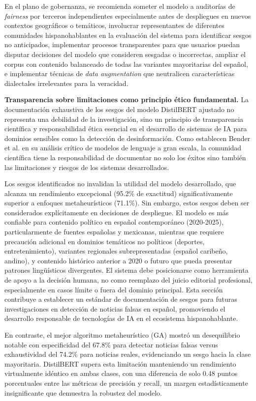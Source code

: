 En el plano de gobernanza, se recomienda someter el modelo a auditorías de \textit{fairness} por terceros independientes especialmente antes de despliegues en nuevos contextos geográficos o temáticos, involucrar representantes de diferentes comunidades hispanohablantes en la evaluación del sistema para identificar sesgos no anticipados, implementar procesos transparentes para que usuarios puedan disputar decisiones del modelo que consideren sesgadas o incorrectas, ampliar el corpus con contenido balanceado de todas las variantes mayoritarias del español, e implementar técnicas de \textit{data augmentation} que neutralicen características dialectales irrelevantes para la veracidad.

\textbf{Transparencia sobre limitaciones como principio ético fundamental.} La documentación exhaustiva de los sesgos del modelo DistilBERT ajustado no representa una debilidad de la investigación, sino un principio de transparencia científica y responsabilidad ética esencial en el desarrollo de sistemas de IA para dominios sensibles como la detección de desinformación. Como establecen Bender et al. \cite{bender2021dangers} en su análisis crítico de modelos de lenguaje a gran escala, la comunidad científica tiene la responsabilidad de documentar no solo los éxitos sino también las limitaciones y riesgos de los sistemas desarrollados. 

Los sesgos identificados no invalidan la utilidad del modelo desarrollado, que alcanza un rendimiento excepcional (95.2\% de exactitud) significativamente superior a enfoques metaheurísticos (71.1\%). Sin embargo, estos sesgos deben ser considerados explícitamente en decisiones de despliegue. El modelo es más confiable para contenido político en español contemporáneo (2020-2025), particularmente de fuentes españolas y mexicanas, mientras que requiere precaución adicional en dominios temáticos no políticos (deportes, entretenimiento), variantes regionales subrepresentadas (español caribeño, andino), y contenido histórico anterior a 2020 o futuro que pueda presentar patrones lingüísticos divergentes. El sistema debe posicionarse como herramienta de apoyo a la decisión humana, no como reemplazo del juicio editorial profesional, especialmente en casos límite o fuera del dominio principal. Esta sección contribuye a establecer un estándar de documentación de sesgos para futuras investigaciones en detección de noticias falsas en español, promoviendo el desarrollo responsable de tecnologías de IA en el ecosistema hispanohablante.

En contraste, el mejor algoritmo metaheurístico (GA) mostró un desequilibrio notable con especificidad del 67.8\% para detectar noticias falsas versus exhaustividad del 74.2\% para noticias reales, evidenciando un sesgo hacia la clase mayoritaria. DistilBERT supera esta limitación manteniendo un rendimiento virtualmente idéntico en ambas clases, con una diferencia de solo 0.48 puntos porcentuales entre las métricas de precisión y recall, un margen estadísticamente insignificante que demuestra la robustez del modelo.

